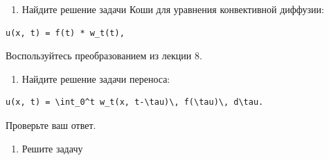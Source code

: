\documentclass[
  ukrainian,
]{article}
\providecommand{\tightlist}{%
  \setlength{\itemsep}{0pt}\setlength{\parskip}{0pt}}
\begin{document}
\begin{enumerate}
\def\labelenumi{\arabic{enumi}.}
\setcounter{enumi}{1}
\tightlist
\item
  Найдите решение задачи Коши для уравнения конвективной диффузии:
\end{enumerate}

\begin{verbatim}
u(x, t) = f(t) * w_t(t),
\end{verbatim}

Воспользуйтесь преобразованием из лекции 8.

\begin{enumerate}
\def\labelenumi{\arabic{enumi}.}
\setcounter{enumi}{2}
\tightlist
\item
  Найдите решение задачи переноса:
\end{enumerate}

\begin{verbatim}
u(x, t) = \int_0^t w_t(x, t-\tau)\, f(\tau)\, d\tau.
\end{verbatim}

Проверьте ваш ответ.

\begin{enumerate}
\def\labelenumi{\arabic{enumi}.}
\setcounter{enumi}{3}
\tightlist
\item
  Решите задачу
\end{enumerate}
\end{document}
